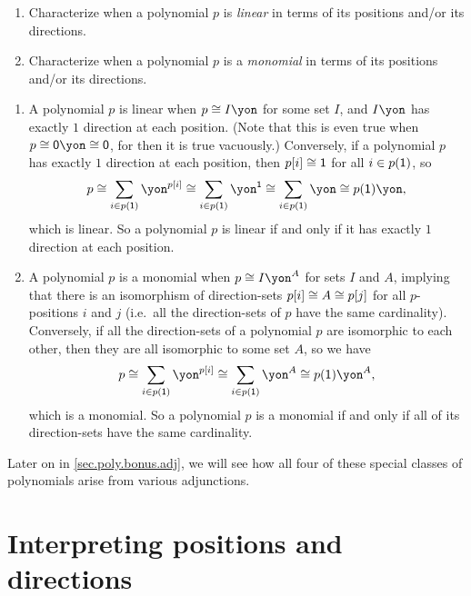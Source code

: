 \documentclass[Book-Poly]{subfiles}
\begin{document}
\begin{exercise}
  \begin{enumerate}
    \item Characterize when a polynomial $p$ is \textit{linear} in terms of its positions and/or its directions.
    \item Characterize when a polynomial $p$ is a \textit{monomial} in terms of its positions and/or its directions. \qedhere
  \end{enumerate}
  \begin{solution}
    \begin{enumerate}
      \item A polynomial $p$ is linear when $p\iso I\yon$ for some set $I$, and $I\yon$ has exactly $1$ direction at each position. (Note that this is even true when $p\iso\0\yon\iso\0$, for then it is true vacuously.)
      Conversely, if a polynomial $p$ has exactly $1$ direction at each position, then $p[i]\cong\textsf{1}$ for all $i\in p(\textsf{1})$, so
      \[
        p
          \iso
        \sum_{i\in p(\1)}\yon^{p[i]}
          \iso
        \sum_{i\in p(\1)}\yon^\1
          \iso
        \sum_{i\in p(\1)}\yon
          \iso
        p(\1)\yon,
      \]
      which is linear.
      So a polynomial $p$ is linear if and only if it has exactly $1$ direction at each position.

      \item A polynomial $p$ is a monomial when $p\iso I\yon^A$ for sets $I$ and $A$, implying that there is an isomorphism of direction-sets $p[i]\cong A\cong p[j]$ for all $p$-positions $i$ and $j$ (i.e.\ all the direction-sets of $p$ have the same cardinality).
      Conversely, if all the direction-sets of a polynomial $p$ are isomorphic to each other, then they are all isomorphic to some set $A$, so we have
      \[
      p
      \iso
      \sum_{i\in p(\1)}\yon^{p[i]}
      \iso
      \sum_{i\in p(\1)}\yon^A
      \iso
      p(\1)\yon^A,
      \]
      which is a monomial.
      So a polynomial $p$ is a monomial if and only if all of its direction-sets have the same cardinality.
    \end{enumerate}
  \end{solution}
\end{exercise}

Later on in \cref{sec.poly.bonus.adj}, we will see how all four of these special classes of polynomials arise from various adjunctions.

\section{Interpreting positions and directions}
\end{document}
